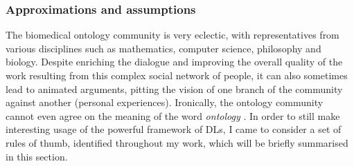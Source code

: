 \subsubsection{Approximations and assumptions}

The biomedical ontology community is very eclectic, with representatives from various disciplines such as mathematics, computer science, philosophy and biology. Despite enriching the dialogue and improving the overall quality of the work resulting from this complex social network of people, it can also sometimes lead to animated arguments, pitting the vision of one branch of the community against another (personal experiences). Ironically, the ontology community cannot even agree on the meaning of the word \emph{ontology} \citep{schulz2013formal}. In order to still make interesting usage of the powerful framework of DLs, I came to consider a set of rules of thumb, identified throughout my work, which will be briefly summarised in this section.

